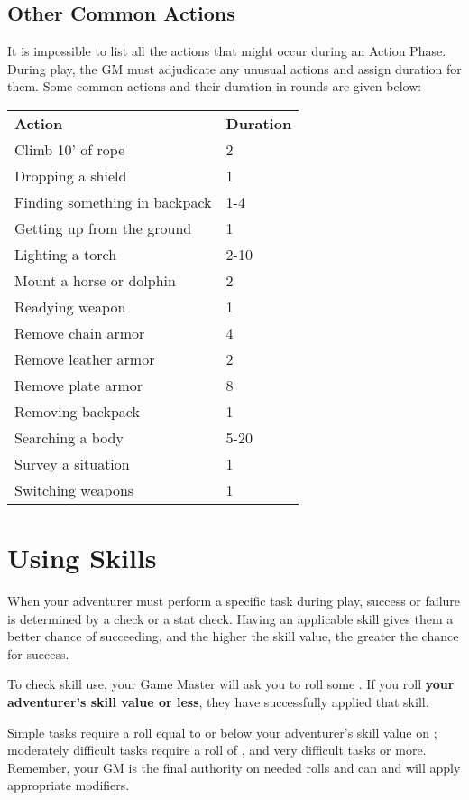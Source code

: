\begin{multicols*}{2}
\subsection{Other Common Actions}
It is impossible to list all the actions that might occur during an Action Phase. During play, the GM must adjudicate any unusual actions and assign duration for them. Some common actions and their duration in rounds are given below:
\begin{normbox}
\small
\begin{tabular}{l l}
\textbf{Action} & \textbf{Duration}\\
Climb 10' of rope & 2\\
Dropping a shield & 1\\
Finding something in backpack & 1-4\\
Getting up from the ground & 1\\
Lighting a torch & 2-10\\
Mount a horse or dolphin & 2\\
Readying weapon & 1\\
Remove chain armor & 4\\
Remove leather armor & 2\\
Remove plate armor & 8\\
Removing backpack & 1\\
Searching a body & 5-20\\
Survey a situation & 1\\
Switching weapons & 1\\
\end{tabular}
\end{normbox}
\section{Using Skills}
When your adventurer must perform a specific task during play, success or failure is determined by a  check or a stat check. Having an applicable skill gives them a better chance of succeeding, and the higher the skill value, the greater the chance for success.

To check skill use, your Game Master will ask you to roll some . If you roll \textbf{your adventurer's skill value or less}, they have successfully applied that skill.

Simple tasks require a roll equal to or below your adventurer's skill value on ; moderately difficult tasks require a roll of , and very difficult tasks  or more. Remember, your GM is the final authority on needed rolls and can and will apply appropriate modifiers.

\end{multicols*}
